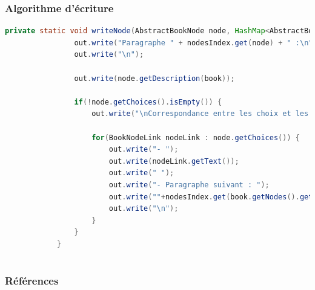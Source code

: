 \documentclass[beamer]{BetterDocument}
\begin{document}
	\begin{frame}[fragile]
		\frametitle{Algorithme d'écriture}

		\begin{lstlisting}[gobble=12, language=java,
    basicstyle=\ttfamily\fontsize{7}{9}\selectfont]
			private static void writeNode(AbstractBookNode node, HashMap<AbstractBookNode, Integer> nodesIndex, Book book, FileWriter out) throws IOException {
				out.write("Paragraphe " + nodesIndex.get(node) + " :\n");
				out.write("\n");

				out.write(node.getDescription(book));

				if(!node.getChoices().isEmpty()) {
					out.write("\nCorrespondance entre les choix et les paragraphes : \n\n");

					for(BookNodeLink nodeLink : node.getChoices()) {
						out.write("- ");
						out.write(nodeLink.getText());
						out.write(" ");
						out.write("- Paragraphe suivant : ");
						out.write(""+nodesIndex.get(book.getNodes().get(nodeLink.getDestination())));
						out.write("\n");
					}
				}
			}
		\end{lstlisting}
	\end{frame}

	\section{}
	\subsection{}
	\begin{frame}[allowframebreaks]
	  \frametitle{Références}

	  \printbibliography
	 \end{frame}
\end{document}
